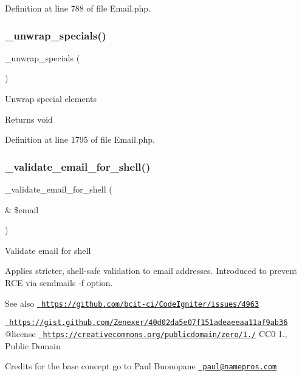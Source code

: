 Definition at line 788 of file Email.\+php.

\mbox{\label{class_c_i___email_af50bcab235f0eff47d7117d77733f1d9}} 
\subsubsection{\texorpdfstring{\_unwrap\_specials()}{\_unwrap\_specials()}}
{\footnotesize\ttfamily \+\_\+unwrap\+\_\+specials (\begin{DoxyParamCaption}{ }\end{DoxyParamCaption})\hspace{0.3cm}{\ttfamily [protected]}}

Unwrap special elements

\begin{DoxyReturn}{Returns}
void 
\end{DoxyReturn}


Definition at line 1795 of file Email.\+php.

\mbox{\label{class_c_i___email_a468f4ab8b122318d39baffe9e727d2be}} 
\subsubsection{\texorpdfstring{\_validate\_email\_for\_shell()}{\_validate\_email\_for\_shell()}}
{\footnotesize\ttfamily \+\_\+validate\+\_\+email\+\_\+for\+\_\+shell (\begin{DoxyParamCaption}\item[{\&}]{\$email }\end{DoxyParamCaption})\hspace{0.3cm}{\ttfamily [protected]}}

Validate email for shell

Applies stricter, shell-\/safe validation to email addresses. Introduced to prevent R\+CE via sendmail\textquotesingle{}s -\/f option.

\begin{DoxySeeAlso}{See also}
\href{https://github.com/bcit-ci/CodeIgniter/issues/4963}{\texttt{ https\+://github.\+com/bcit-\/ci/\+Code\+Igniter/issues/4963}} 

\href{https://gist.github.com/Zenexer/40d02da5e07f151adeaeeaa11af9ab36}{\texttt{ https\+://gist.\+github.\+com/\+Zenexer/40d02da5e07f151adeaeeaa11af9ab36}} @license \href{https://creativecommons.org/publicdomain/zero/1.0/}{\texttt{ https\+://creativecommons.\+org/publicdomain/zero/1./}} C\+C0 1., Public Domain
\end{DoxySeeAlso}
Credits for the base concept go to Paul Buonopane \href{mailto:paul@namepros.com}{\texttt{ paul@namepros.\+com}}


